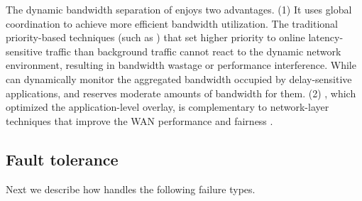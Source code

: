 
The dynamic bandwidth separation of \name enjoys two advantages. (1) It uses global coordination to achieve more efficient bandwidth utilization. The traditional priority-based techniques (such as \cite{kumar2015bwe}) that set higher priority to online latency-sensitive traffic than background traffic cannot react to the dynamic network environment, resulting in bandwidth wastage or performance interference. While \name can dynamically monitor the aggregated bandwidth occupied by delay-sensitive applications, and reserves moderate amounts of bandwidth for them.
(2) \name, which optimized the application-level overlay, is complementary to network-layer techniques that improve the WAN performance and fairness \cite{chen2012design, kavulya2010analysis, mishra2010towards, reiss2012heterogeneity}.




\subsection{Fault tolerance}
\label{subsec:system:fault}
Next we describe how \name handles the following failure types.


